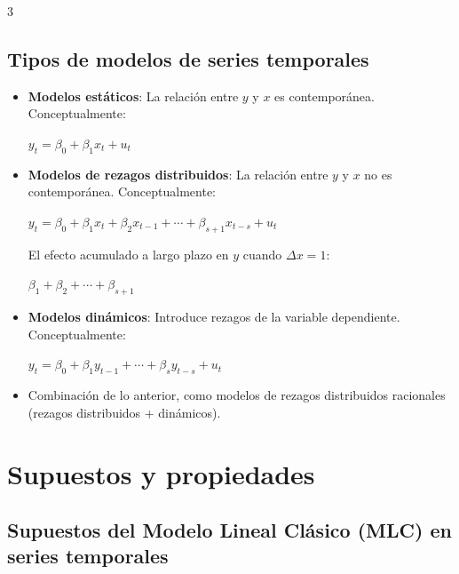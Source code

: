 \documentclass[10pt, a4paper, landscape]{article}
\begin{document}
\begin{multicols}{3}
\subsection*{Tipos de modelos de series temporales}

\begin{itemize}[leftmargin=*]
	\item \textbf{Modelos estáticos}: La relación entre \( y \) y \( x \) es contemporánea. Conceptualmente:
	\begin{center}
		\( y_{t} = \beta_{0} + \beta_{1} x_{t} + u_{t} \)
	\end{center}
	\item \textbf{Modelos de rezagos distribuidos}: La relación entre \( y \) y \( x \) no es contemporánea. Conceptualmente:
	\begin{center}
		\( y_{t} = \beta_{0} + \beta_{1} x_{t} + \beta_{2} x_{t - 1} + \cdots + \beta_{s + 1} x_{t - s} + u_{t} \)
	\end{center}
	El efecto acumulado a largo plazo en \( y \) cuando \( \Delta x = 1 \):
	\begin{center}
		\( \beta_{1} + \beta_{2} + \cdots + \beta_{s + 1} \)
	\end{center}
	\item \textbf{Modelos dinámicos}: Introduce rezagos de la variable dependiente. Conceptualmente:
	\begin{center}
		\( y_{t} = \beta_{0} + \beta_{1} y_{t - 1} + \cdots + \beta_{s} y_{t - s} + u_{t} \)
	\end{center}
	\item Combinación de lo anterior, como modelos de rezagos distribuidos racionales (rezagos distribuidos + dinámicos).
\end{itemize}

\columnbreak

\section*{Supuestos y propiedades}

\subsection*{Supuestos del Modelo Lineal Clásico (MLC) en series temporales}


\end{multicols}
\end{document}
